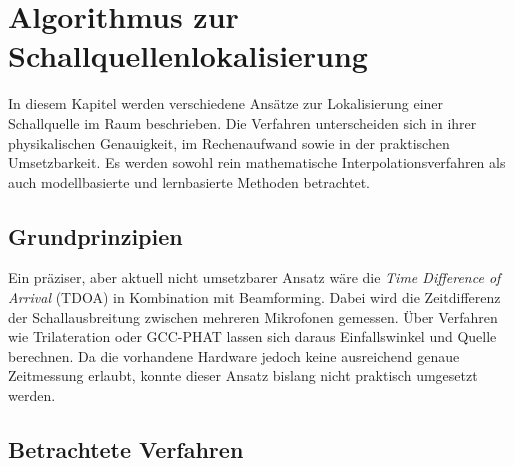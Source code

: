 \chapter{Algorithmus zur Schallquellenlokalisierung}

In diesem Kapitel werden verschiedene Ansätze zur Lokalisierung einer Schallquelle im Raum beschrieben. Die Verfahren unterscheiden sich in ihrer physikalischen Genauigkeit, im Rechenaufwand sowie in der praktischen Umsetzbarkeit. Es werden sowohl rein mathematische Interpolationsverfahren als auch modellbasierte und lernbasierte Methoden betrachtet.

\section{Grundprinzipien}

Ein präziser, aber aktuell nicht umsetzbarer Ansatz wäre die \textit{Time Difference of Arrival} (TDOA) in Kombination mit Beamforming. Dabei wird die Zeitdifferenz der Schallausbreitung zwischen mehreren Mikrofonen gemessen. Über Verfahren wie Trilateration oder GCC-PHAT lassen sich daraus Einfallswinkel und Quelle berechnen.  
Da die vorhandene Hardware jedoch keine ausreichend genaue Zeitmessung erlaubt, konnte dieser Ansatz bislang nicht praktisch umgesetzt werden.

\section{Betrachtete Verfahren}

